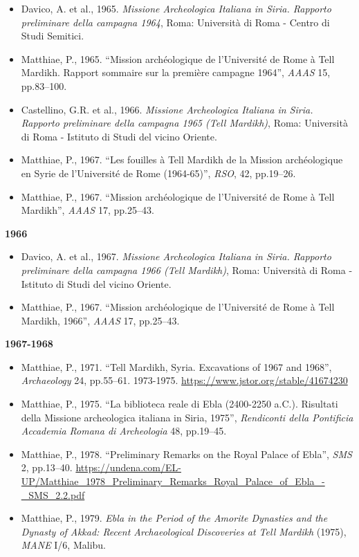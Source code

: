 \documentclass[
]{book}
\providecommand{\tightlist}{%
  \setlength{\itemsep}{0pt}\setlength{\parskip}{0pt}}
\begin{document}
\begin{itemize}
\tightlist
\item
  Davico, A. et al., 1965. \emph{Missione Archeologica Italiana in Siria. Rapporto preliminare della campagna 1964}, Roma: Università di Roma - Centro di Studi Semitici.
\item
  Matthiae, P., 1965. ``Mission archéologique de l'Université de Rome à Tell Mardikh. Rapport sommaire sur la première campagne 1964'', \emph{AAAS} 15, pp.83--100.
\item
  Castellino, G.R. et al., 1966. \emph{Missione Archeologica Italiana in Siria. Rapporto preliminare della campagna 1965 (Tell Mardikh)}, Roma: Università di Roma - Istituto di Studi del vicino Oriente.
\item
  Matthiae, P., 1967. ``Les fouilles à Tell Mardikh de la Mission archéologique en Syrie de l'Université de Rome (1964-65)'', \emph{RSO}, 42, pp.19--26.
\item
  Matthiae, P., 1967. ``Mission archéologique de l'Université de Rome à Tell Mardikh'', \emph{AAAS} 17, pp.25--43.
\end{itemize}

\textbf{1966}

\begin{itemize}
\tightlist
\item
  Davico, A. et al., 1967. \emph{Missione Archeologica Italiana in Siria. Rapporto preliminare della campagna 1966 (Tell Mardikh)}, Roma: Università di Roma - Istituto di Studi del vicino Oriente.
\item
  Matthiae, P., 1967. ``Mission archéologique de l'Université de Rome à Tell Mardikh, 1966'', \emph{AAAS} 17, pp.25--43.
\end{itemize}

\textbf{1967-1968}

\begin{itemize}
\tightlist
\item
  Matthiae, P., 1971. ``Tell Mardikh, Syria. Excavations of 1967 and 1968'', \emph{Archaeology} 24, pp.55--61.
  1973-1975. \url{https://www.jstor.org/stable/41674230}
\item
  Matthiae, P., 1975. ``La biblioteca reale di Ebla (2400-2250 a.C.). Risultati della Missione archeologica italiana in Siria, 1975'', \emph{Rendiconti della Pontificia Accademia Romana di Archeologia} 48, pp.19--45.
\item
  Matthiae, P., 1978. ``Preliminary Remarks on the Royal Palace of Ebla'', \emph{SMS} 2, pp.13--40. \url{https://undena.com/EL-UP/Matthiae_1978_Preliminary_Remarks_Royal_Palace_of_Ebla_-_SMS_2.2.pdf}
\item
  Matthiae, P., 1979. \emph{Ebla in the Period of the Amorite Dynasties and the Dynasty of Akkad: Recent Archaeological Discoveries at Tell Mardikh} (1975), \emph{MANE} I/6, Malibu.
\end{itemize}
\end{document}
